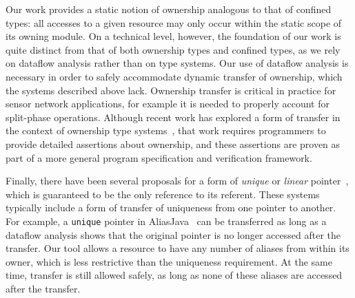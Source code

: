 Our work provides a static notion of ownership analogous to that of
confined types:  all accesses to a given resource may only occur
within the static scope of its owning module.  On a technical level,
however, the foundation of our work is quite distinct from that of
both ownership types and confined types, as we rely on dataflow
analysis rather than on type systems.  Our use of dataflow analysis is
necessary in order to safely accommodate dynamic transfer of
ownership, which the systems described above lack.  Ownership transfer
is critical in practice for sensor network applications, for example
it is needed 
to properly account for split-phase operations.  Although recent work
has explored a form of transfer in the context of ownership type
systems~\cite{DBLP:conf/ecoop/BanerjeeN05}, that work requires
programmers to provide detailed assertions about ownership, and these
assertions are proven as part of a more general program specification
and verification framework.


Finally, there have been several proposals for a form of {\em unique}
or {\em linear}
pointer~\cite{Boyland:2001:ABU,aliasjava,Wad90:linear,adoption-focus},
which is guaranteed to be the only reference to its referent.  These
systems typically include a form of transfer of uniqueness from one
pointer to another.  For example, a {\tt unique} pointer in
AliasJava~\cite{aliasjava} can be transferred as long as a dataflow
analysis shows that the original pointer is no longer accessed after
the transfer.  Our tool allows a resource to have any number of
aliases from within its owner, which is less restrictive than the
uniqueness requirement.  At the same time, transfer is still allowed
safely, as long as none of these aliases are accessed after the
transfer.

